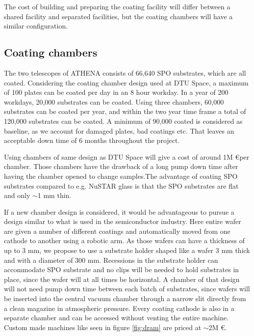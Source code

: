 The cost of building and preparing the coating facility will differ between a shared facility and separated facilities, but the coating chambers will have a similar configuration.

\subsection{Coating chambers}\label{sec:chambers}
The two telescopes of ATHENA consists of 66,640 SPO substrates, which are all coated. Considering the coating chamber design used at DTU Space, a maximum of 100 plates can be coated per day in an 8 hour workday. In a year of 200 workdays, 20,000 substrates can be coated. Using three chambers, 60,000 substrates can be coated per year, and within the two year time frame a total of 120,000 substrates can be coated. A minimum of 90,000 coated is considered as baseline, as we account for damaged plates, bad coatings etc. That leaves an acceptable down time of 6 months throughout the project.

Using chambers of same design as DTU Space will give a cost of around 1M \euro per chamber. Those chambers have the drawback of a long pump down time after having the chamber opened to change samples.The advantage of coating SPO substrates compared to e.g. NuSTAR glass is that the SPO substrates are flat and only $\sim$1 mm thin.

If a new chamber design is considered, it would be advantageous to pursue a design similar to what is used in the semiconductor industry. Here entire wafer are given a number of different coatings and automatically moved from one cathode to another using a robotic arm. As those wafers can have a thickness of up to 3 mm, we propose to use a substrate holder shaped like a wafer 3 mm thick and with a diameter of 300 mm. Recessions in the substrate holder can accommodate SPO substrate and no clips will be needed to hold substrates in place, since the wafer will at all times be horizontal. A chamber of that design will not need pump down time between each batch of substrates, since wafers will be inserted into the central vacuum chamber through a narrow slit directly from a clean magazine in atmospheric pressure. Every coating cathode is also in a separate chamber and can be accessed without venting the entire machine. Custom made machines like seen in figure \ref{fig:dram} are priced at $\sim$2M \euro.

